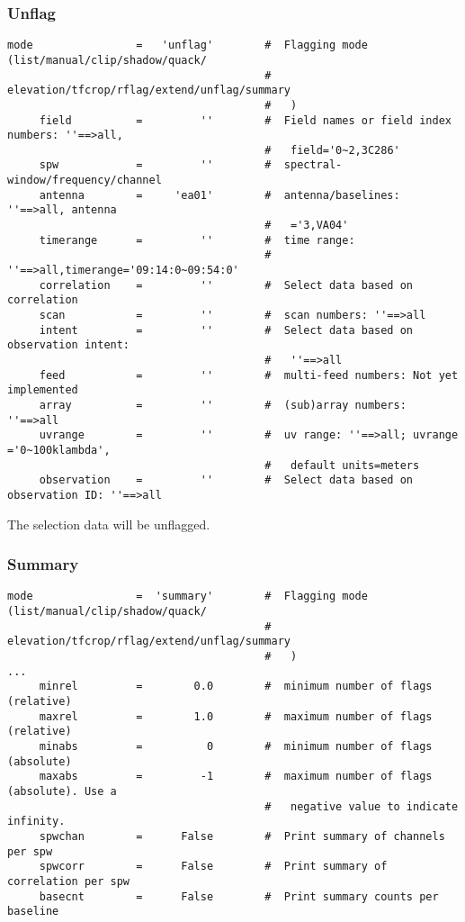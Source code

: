 \subsubsection{Unflag}
\label{section:edit.flagdata.mode.unflag}
\small
\begin{verbatim}
mode                =   'unflag'        #  Flagging mode (list/manual/clip/shadow/quack/
                                        #   elevation/tfcrop/rflag/extend/unflag/summary
                                        #   )
     field          =         ''        #  Field names or field index numbers: ''==>all,
                                        #   field='0~2,3C286'
     spw            =         ''        #  spectral-window/frequency/channel
     antenna        =     'ea01'        #  antenna/baselines: ''==>all, antenna
                                        #   ='3,VA04'
     timerange      =         ''        #  time range:
                                        #   ''==>all,timerange='09:14:0~09:54:0'
     correlation    =         ''        #  Select data based on correlation
     scan           =         ''        #  scan numbers: ''==>all
     intent         =         ''        #  Select data based on observation intent:
                                        #   ''==>all
     feed           =         ''        #  multi-feed numbers: Not yet implemented
     array          =         ''        #  (sub)array numbers: ''==>all
     uvrange        =         ''        #  uv range: ''==>all; uvrange ='0~100klambda',
                                        #   default units=meters
     observation    =         ''        #  Select data based on observation ID: ''==>all
\end{verbatim}
\normalsize

The selection data will be unflagged. 


\subsubsection{Summary}
\label{section:edit.flagdata.mode.summary}
\small
\begin{verbatim}
mode                =  'summary'        #  Flagging mode (list/manual/clip/shadow/quack/
                                        #   elevation/tfcrop/rflag/extend/unflag/summary
                                        #   )
...
     minrel         =        0.0        #  minimum number of flags (relative)
     maxrel         =        1.0        #  maximum number of flags (relative)
     minabs         =          0        #  minimum number of flags (absolute)
     maxabs         =         -1        #  maximum number of flags (absolute). Use a
                                        #   negative value to indicate infinity.
     spwchan        =      False        #  Print summary of channels per spw
     spwcorr        =      False        #  Print summary of correlation per spw
     basecnt        =      False        #  Print summary counts per baseline
\end{verbatim}
\normalsize

